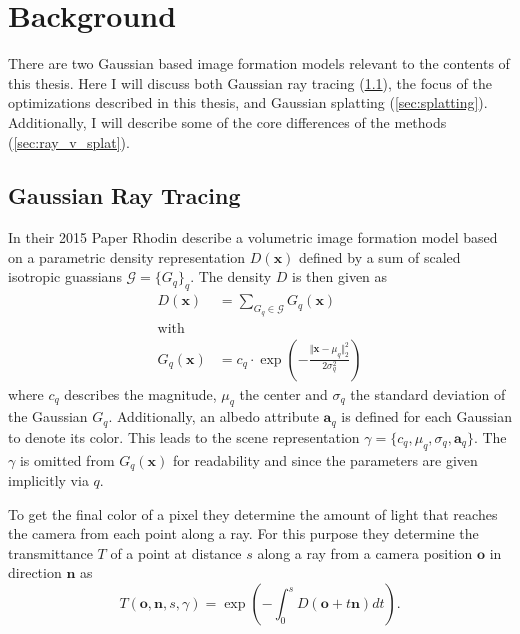 \documentclass[a4paper, 11pt]{memoir}
\begin{document}
    \chapter{Background}
    \label{ch:background}
    There are two Gaussian based image formation models relevant to the contents of this thesis. Here I will discuss both
    Gaussian ray tracing (\ref{sec:int_grt}), the focus of the optimizations described in this thesis, and Gaussian
    splatting (\ref{sec:splatting}). Additionally, I will describe some of the core differences of the methods (\ref{sec:ray_v_splat}).

    \section{Gaussian Ray Tracing}
    \label{sec:int_grt}
    In their 2015 Paper  \cite{Rhodin:2015} Rhodin \etal describe a volumetric image formation
    model based on a parametric density representation $D(\mathbf{x})$ defined by a sum of scaled isotropic guassians
    $\mathcal{G} = \{ G_q \}_q$. The density $D$ is then given as
    \begin{align}
        D(\mathbf{x}) &= \sum_{G_q \in \mathcal{G}} G_q(\mathbf{x})
        \label{eq:density}\\
        \text{with} \nonumber\\
        G_q(\mathbf{x}) &= c_q \cdot \exp{\left( - \frac{\Vert\mathbf{x} - \mu_q\Vert_2^2}{2\sigma_q^2} \right)}
        \label{eq:gaussian}
    \end{align}
    where $c_q$ describes the magnitude, $\mu_q$ the center and $\sigma_q$ the standard deviation of the Gaussian $G_q$.
    Additionally, an \gls{albedo} attribute $\mathbf{a}_q$ is defined for each Gaussian to denote its color. This leads
    to the scene representation $\gamma = \{ c_q, \mu_q, \sigma_q, \mathbf{a}_q \}$. The $\gamma$ is omitted from
    $G_q(\mathbf{x})$ for readability and since the parameters are given implicitly via $q$.

    To get the final color of a pixel they determine the amount of light that reaches the camera from each point
    along a ray. For this purpose they determine the \gls{transmittance} $T$ of a point at distance $s$ along a ray from
    a camera position $\mathbf{o}$ in direction $\mathbf{n}$ as
    \begin{equation}
        T(\mathbf{o}, \mathbf{n}, s, \gamma) = \exp{\left( - \int_0^s D(\mathbf{o} + t\mathbf{n}) dt \right)}.
        \label{eq:transmittance}
    \end{equation}
\end{document}
